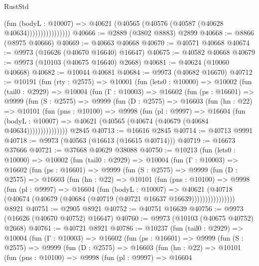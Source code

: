 \begin{lexlean}{RustStd}
\begin{coremodule}
                          (fun (bodyL : @10007) =>
                          @40621 (@40565 (@40576 (@40587 (@40628 @40634))))))))))))))))
@40666 := @2889 (@3802 @8883) @2899
@40668 := @8866 (@8975 @40666)
@40669 := @40663 @40668
@40670 := @40571 @40668
@40674 := @9973 (@16626 (@40670 @16640) @16647)
@40675 := @40582 @40668
@40679 := @9973 (@10103 (@40675 @16640) @2668)
@40681 := @40624 (@10060 @40668)
@40682 := @10044 @40681
@40684 := @9973 (@40682 @16670)
@40712 := @10191
    (fun (rty : @2575) =>
    @10001
      (fun (lets0 : @10000) =>
      @10002
        (fun (tail0 : @2929) =>
        @10004
          (fun (Γ : @10003) =>
          @16602
            (fun (ps : @16601) =>
            @9999
              (fun (S : @2575) =>
              @9999
                (fun (D : @2575) =>
                @16603
                  (fun (hn : @22) =>
                  @10101
                    (fun (pns : @10100) =>
                    @9998
                      (fun (pl : @9997) =>
                      @16604
                        (fun (bodyL : @10007) =>
                        @40621 (@40565 (@40674 (@40679 (@40684 @40634)))))))))))))))
    @2845
@40713 := @16616 @2845
@40714 := @40713 @9991
@40718 := @9973 (@40563 (@16613 (@16615 @40714)))
@40719 := @16673 @37666
@40721 := @37668 @40629 @38088
@40750 := @10213
    (fun (lets0 : @10000) =>
    @10002
      (fun (tail0 : @2929) =>
      @10004
        (fun (Γ : @10003) =>
        @16602
          (fun (ps : @16601) =>
          @9999
            (fun (S : @2575) =>
            @9999
              (fun (D : @2575) =>
              @16603
                (fun (hn : @22) =>
                @10101
                  (fun (pns : @10100) =>
                  @9998
                    (fun (pl : @9997) =>
                    @16604
                      (fun (bodyL : @10007) =>
                      @40621
                        (@40718
                          (@40674 (@40679 (@40684 (@40719 (@40721 @16637 @16639))))))))))))))))
    @8921
@40751 := @2905 @8921
@40752 := @40751 @16639
@40756 := @9973 (@16626 (@40670 @40752) @16647)
@40760 := @9973 (@10103 (@40675 @40752) @2668)
@40761 := @40721 @8921
@40786 := @10237
    (fun (tail0 : @2929) =>
    @10004
      (fun (Γ : @10003) =>
      @16602
        (fun (ps : @16601) =>
        @9999
          (fun (S : @2575) =>
          @9999
            (fun (D : @2575) =>
            @16603
              (fun (hn : @22) =>
              @10101
                (fun (pns : @10100) =>
                @9998
                  (fun (pl : @9997) =>
                  @16604

\end{coremodule}
\end{lexlean}
